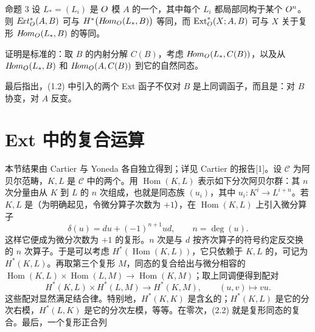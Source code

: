\begin{statement}{命题 3}
设 $L_*=(L_i)$ 是 $O$ 模 $A$ 的一个，其中每个 $L_i$ 都局部同构于某个 $O^n$。则 $E\!xt_{O}^{*}(A,B)$ 可与 $H^*\bigl(H\!om_{O}(L_*,B)\bigr)$ 等同，而 $\operatorname{Ext}_{O}^{*}(X;A,B)$ 可与 $X$ 关于复形 $H\!om_{O}(L_*,B)$ 的等同。
\end{statement}
证明是标准的：取 $B$ 的内射分解 $C(B)$，考虑 $H\!om_{O}(L_*,C(B))$，以及从 $H\!om_{O}(L_*,B)$ 和 $H\!om_{O}(A,C(B))$ 到它的自然同态。

最后指出，(1.2) 中引入的两个 Ext 函子不仅对 $B$ 是上同调函子，而且是：对 $B$ 协变，对 $A$ 反变。

\section{Ext 中的复合运算}
本节结果由 Cartier 与 Yoneda 各自独立得到；详见 Cartier 的报告[1]。设 $\mathcal C$ 为阿贝尔范畴，$K,L$ 是 $\mathcal C$ 中的两个。用 $\operatorname{Hom}(K,L)$ 表示如下分次阿贝尔群：其 $n$ 次分量由从 $K$ 到 $L$ 的 $n$ 次组成，也就是同态族 $(u_i)$，其中 $u_i:K^i\to L^{i+n}$。若 $K,L$ 是（为明确起见，令微分算子次数为 $+1$），在 $\operatorname{Hom}(K,L)$ 上引入微分算子
\begin{equation}
\delta(u)=du+(-1)^{n+1}ud,\qquad n=\deg(u).
\tag{2.1}
\end{equation}
这样它便成为微分次数为 $+1$ 的复形。$n$ 次是与 $d$ 按齐次算子的符号约定反交换的 $n$ 次算子。于是可以考虑 $H^*(\operatorname{Hom}(K,L))$，它只依赖于 $K,L$ 的，可记为 $H^*(K,L)$。再取第三个复形 $M$，同态的复合给出与微分相容的
$\operatorname{Hom}(K,L)\times\operatorname{Hom}(L,M)\to\operatorname{Hom}(K,M)$；取上同调便得到配对
\begin{equation}
H^*(K,L)\times H^*(L,M)\longrightarrow H^*(K,M),
\qquad(u,v)\longmapsto vu.
\tag{2.2}
\end{equation}
这些配对显然满足结合律。特别地，$H^*(K,K)$ 是含幺的；$H^*(K,L)$ 是它的分次右模，$H^*(L,K)$ 是它的分次左模，等等。在零次，(2.2) 就是复形同态的复合。最后，一个复形正合列

